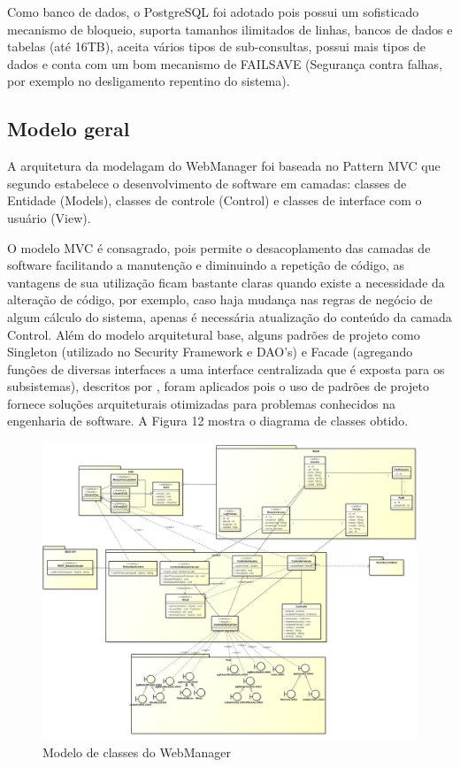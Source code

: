Como banco de dados, o PostgreSQL foi adotado  pois possui um sofisticado mecanismo de bloqueio, suporta tamanhos ilimitados de linhas, bancos de dados e tabelas (até 16TB), aceita vários tipos de sub-consultas, possui mais tipos de dados e conta com um bom mecanismo de FAILSAVE (Segurança contra falhas, por exemplo no desligamento repentino do sistema).

\subsection{Modelo geral}

A arquitetura da modelagam do WebManager foi baseada no Pattern MVC que segundo \textcite{Mendes:2002} estabelece o desenvolvimento de software em camadas: classes de Entidade (Models), classes de controle (Control) e classes de interface com o usuário (View). 

O modelo MVC é consagrado, pois permite o desacoplamento das camadas de software facilitando a manutenção e diminuindo a repetição de código, as vantagens de sua utilização ficam bastante claras quando existe a necessidade da alteração de código, por exemplo, caso haja mudança nas regras de negócio de algum cálculo do sistema, apenas é necessária atualização do conteúdo da camada Control. Além do modelo arquitetural base, alguns padrões de projeto como Singleton (utilizado no Security Framework e DAO's) e Facade (agregando funções de diversas interfaces a uma interface centralizada que é exposta para os subsistemas), descritos por \textcite{Gamma:2000}, foram aplicados pois o uso de padrões de projeto fornece soluções arquiteturais otimizadas para problemas conhecidos na engenharia de software. A Figura 12 mostra o diagrama de classes obtido.

\begin{landscape}

\begin{figure}[!htb]
	\centering
	\includegraphics[width=20.00cm\textwidth]{figures/6_web_manager.png}
	\caption{Modelo de classes do WebManager}
	\label{Figura 12}
\end{figure}
\end{landscape}

